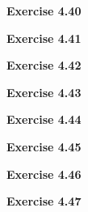 \documentclass{article}
\begin{document}
\bigskip

\begin{framed}
    \noindent \textbf{Exercise 4.40}
    
    \medskip
    
    
\end{framed}


\bigskip

\begin{framed}
    \noindent \textbf{Exercise 4.41}
    
    \medskip
    
    
\end{framed}


\bigskip

\begin{framed}
    \noindent \textbf{Exercise 4.42}
    
    \medskip
    
    
\end{framed}


\bigskip

\begin{framed}
    \noindent \textbf{Exercise 4.43}
    
    \medskip
    
    
\end{framed}


\bigskip

\begin{framed}
    \noindent \textbf{Exercise 4.44}
    
    \medskip
    
    
\end{framed}


\bigskip

\begin{framed}
    \noindent \textbf{Exercise 4.45}
    
    \medskip
    
    
\end{framed}


\bigskip

\begin{framed}
    \noindent \textbf{Exercise 4.46}
    
    \medskip
    
    
\end{framed}


\bigskip

\begin{framed}
    \noindent \textbf{Exercise 4.47}
    
    \medskip
    
    
\end{framed}
\end{document}

